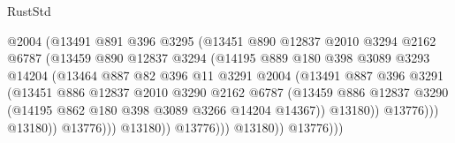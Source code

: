 \begin{lexlean}{RustStd}
\begin{coremodule}
{\begin{coremodule}
{{{{{{{{{{{{{{{{{{{{{{{{{{{{{{{                                  @2004
                                  (@13491
                                    @891
                                    @396
                                    @3295
                                    (@13451
                                      @890
                                      @12837
                                      @2010
                                      @3294
                                      @2162
                                      @6787
                                      (@13459
                                        @890
                                        @12837
                                        @3294
                                        (@14195
                                          @889
                                          @180
                                          @398
                                          @3089
                                          @3293
                                          @14204
                                          (@13464
                                            @887
                                            @82
                                            @396
                                            @11
                                            @3291
                                            @2004
                                            (@13491
                                              @887
                                              @396
                                              @3291
                                              (@13451
                                                @886
                                                @12837
                                                @2010
                                                @3290
                                                @2162
                                                @6787
                                                (@13459
                                                  @886
                                                  @12837
                                                  @3290
                                                  (@14195 @862 @180 @398 @3089 @3266 @14204 @14367))
                                                @13180))
                                            @13776)))
                                      @13180))
                                  @13776)))
                            @13180))
                        @13776)))
                  @13180))
              @13776)))
}}}}}}}}}}}}}}}}}}}}}}}}}}}}}}}
\end{coremodule}}
\end{coremodule}
\end{lexlean}
